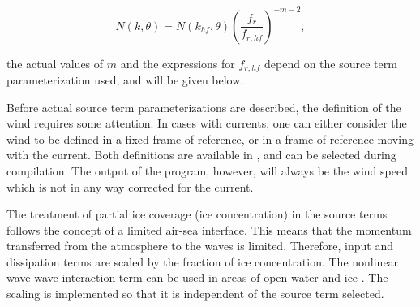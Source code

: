 \begin{equation}
N(k,\theta) = N(k_{hf},\theta) \left ( \frac{f_r}{f_{r,hf}}
\right ) ^{-m-2} \label{eq:tail_N_k} ,
\end{equation}

\noindent
the actual values of $m$ and the expressions for $f_{r,hf}$ depend on the
source term parameterization used, and will be given below.

Before actual source term parameterizations are described, the definition of
the wind requires some attention. In cases with currents, one can either
consider the wind to be defined in a fixed frame of reference, or in a frame
of reference moving with the current. Both definitions are available in \ws,
and can be selected during compilation. The output of the program, however,
will always be the wind speed which is not in any way corrected for the
current.

The treatment of partial ice coverage (ice concentration) in the source terms
follows the concept of a limited air-sea interface. This means that the momentum
transferred from the atmosphere to the waves is limited. Therefore, input and
dissipation terms are scaled by the fraction of ice concentration. The
nonlinear wave-wave interaction term can be used in areas of open water
and ice \citep{art:PL07}. The scaling is implemented so that it is independent
of the source term selected.

